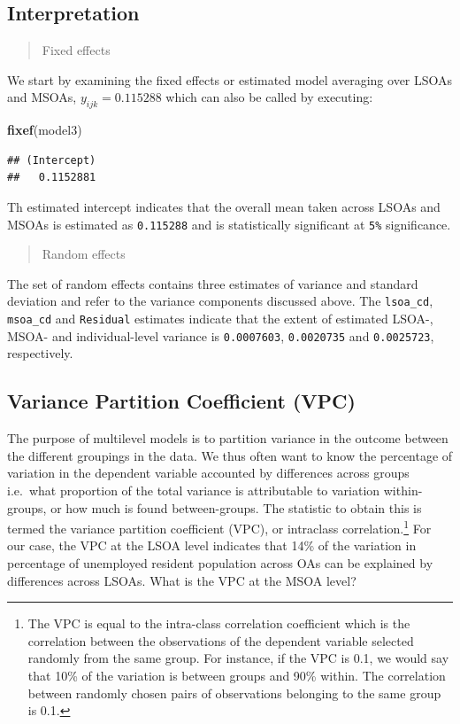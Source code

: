 \documentclass[
]{book}
\newenvironment{Shaded}{\begin{snugshade}}{\end{snugshade}}
\newcommand{\KeywordTok}[1]{\textcolor[rgb]{0.13,0.29,0.53}{\textbf{#1}}}
\newcommand{\NormalTok}[1]{#1}
\begin{document}
\hypertarget{interpretation}{%
\subsection{Interpretation}\label{interpretation}}

\begin{quote}
Fixed effects
\end{quote}

We start by examining the fixed effects or estimated model averaging over LSOAs and MSOAs, \(y_{ijk} = 0.115288\) which can also be called by executing:

\begin{Shaded}
\begin{Highlighting}[]
\KeywordTok{fixef}\NormalTok{(model3)}
\end{Highlighting}
\end{Shaded}

\begin{verbatim}
## (Intercept) 
##   0.1152881
\end{verbatim}

Th estimated intercept indicates that the overall mean taken across LSOAs and MSOAs is estimated as \texttt{0.115288} and is statistically significant at \texttt{5\%} significance.

\begin{quote}
Random effects
\end{quote}

The set of random effects contains three estimates of variance and standard deviation and refer to the variance components discussed above. The \texttt{lsoa\_cd}, \texttt{msoa\_cd} and \texttt{Residual} estimates indicate that the extent of estimated LSOA-, MSOA- and individual-level variance is \texttt{0.0007603}, \texttt{0.0020735} and \texttt{0.0025723}, respectively.

\hypertarget{variance-partition-coefficient-vpc}{%
\subsection{Variance Partition Coefficient (VPC)}\label{variance-partition-coefficient-vpc}}

The purpose of multilevel models is to partition variance in the outcome between the different groupings in the data. We thus often want to know the percentage of variation in the dependent variable accounted by differences across groups i.e.~what proportion of the total variance is attributable to variation within-groups, or how much is found between-groups. The statistic to obtain this is termed the variance partition coefficient (VPC), or intraclass correlation.\footnote{The VPC is equal to the intra-class correlation coefficient which is the correlation between the observations of the dependent variable selected randomly from the same group. For instance, if the VPC is 0.1, we would say that 10\% of the variation is between groups and 90\% within. The correlation between randomly chosen pairs of observations belonging to the same group is 0.1.} For our case, the VPC at the LSOA level indicates that 14\% of the variation in percentage of unemployed resident population across OAs can be explained by differences across LSOAs. What is the VPC at the MSOA level?
\end{document}

